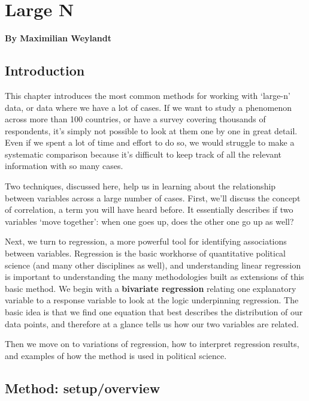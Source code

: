 \documentclass{book}
\begin{document}
\hypertarget{large-n}{%
\chapter{Large N}\label{large-n}}

\textbf{By Maximilian Weylandt}

\hypertarget{introduction-6}{%
\section{Introduction}\label{introduction-6}}

This chapter introduces the most common methods for working with `large-n'
data, or data where we have a lot of cases. If we want to study a phenomenon
across more than 100 countries, or have a survey covering thousands of
respondents, it's simply not possible to look at them one by one in great
detail. Even if we spent a lot of time and effort to do so, we would struggle
to make a systematic comparison because it's difficult to keep track of all
the relevant information with so many cases.

Two techniques, discussed here, help us in learning about the relationship
between variables across a large number of cases. First, we'll discuss the
concept of correlation, a term you will have heard before. It essentially
describes if two variables `move together': when one goes up, does the other
one go up as well?

Next, we turn to regression, a more powerful tool for identifying associations
between variables. Regression is the basic workhorse of quantitative political
science (and many other disciplines as well), and understanding linear
regression is important to understanding the many methodologies built as
extensions of this basic method. We begin with a \textbf{bivariate regression}
relating one explanatory variable to a response variable to look at the logic
underpinning regression. The basic idea is that we find one equation that best
describes the distribution of our data points, and therefore at a glance tells
us how our two variables are related.

Then we move on to variations of regression, how to interpret regression
results, and examples of how the method is used in political science.

\hypertarget{method-setupoverview-1}{%
\section{Method: setup/overview}\label{method-setupoverview-1}}
\end{document}
